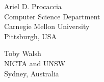 \documentclass{comsoc2014}
\begin{document}


\begin{contact}
Ariel D. Procaccia\\
Computer Science Department\\
Carnegie Mellon University\\
Pittsburgh, USA\\
\end{contact}

\begin{contact}
Toby Walsh\\
NICTA and UNSW\\
Sydney, Australia\\
\end{contact}

\end{document}
